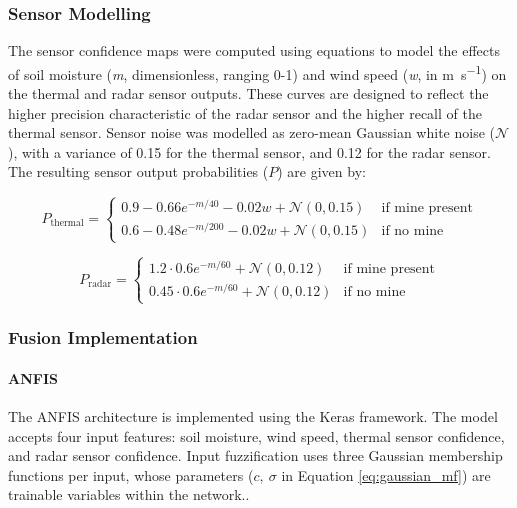 \subsubsection{Sensor Modelling}  

    The sensor confidence maps were computed using equations to model the effects of soil moisture (\textit{m}, dimensionless, ranging 0-1) and wind speed (\textit{w}, in \si{\metre\per\second}) on the thermal and radar sensor outputs. These curves are designed to reflect the higher precision characteristic of the radar sensor and the higher recall of the thermal sensor. Sensor noise was modelled as zero-mean Gaussian white noise ($\mathcal{N}$), with a variance of 0.15 for the thermal sensor, and 0.12 for the radar sensor. The resulting sensor output probabilities ($P$) are given by:
    
    \begin{equation}
        P_{\text{thermal}} = \begin{cases} 
        0.9 - 0.66e^{-m/40} - 0.02w + \mathcal{N}(0,0.15) & \text{if mine present} \\
        0.6 - 0.48e^{-m/200} - 0.02w + \mathcal{N}(0,0.15) & \text{if no mine}
        \end{cases}
    \end{equation}
    
    \begin{equation}
        P_{\text{radar}} = \begin{cases}
        1.2 \cdot 0.6e^{-m/60} + \mathcal{N}(0,0.12) & \text{if mine present} \\
        0.45 \cdot 0.6e^{-m/60} + \mathcal{N}(0,0.12) & \text{if no mine}
        \end{cases}
    \end{equation}

\subsubsection{Fusion Implementation}

    \paragraph{ANFIS} The ANFIS architecture is implemented using the Keras framework. The model accepts four input features: soil moisture, wind speed, thermal sensor confidence, and radar sensor confidence. Input fuzzification uses three Gaussian membership functions per input, whose parameters ($c,~\sigma$ in Equation \ref{eq:gaussian_mf}) are trainable variables within the network..

